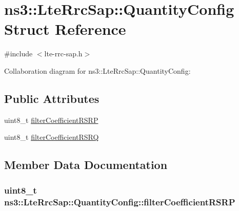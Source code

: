 \hypertarget{structns3_1_1LteRrcSap_1_1QuantityConfig}{}\section{ns3\+:\+:Lte\+Rrc\+Sap\+:\+:Quantity\+Config Struct Reference}
\label{structns3_1_1LteRrcSap_1_1QuantityConfig}


{\ttfamily \#include $<$lte-\/rrc-\/sap.\+h$>$}



Collaboration diagram for ns3\+:\+:Lte\+Rrc\+Sap\+:\+:Quantity\+Config\+:
\subsection*{Public Attributes}
\begin{DoxyCompactItemize}
\item 
uint8\+\_\+t \hyperlink{structns3_1_1LteRrcSap_1_1QuantityConfig_ac60962e2b022dfa1b9b3d28b7900a4f8}{filter\+Coefficient\+R\+S\+RP}
\item 
uint8\+\_\+t \hyperlink{structns3_1_1LteRrcSap_1_1QuantityConfig_a5b8c0642e518d9410c533069a442f3f0}{filter\+Coefficient\+R\+S\+RQ}
\end{DoxyCompactItemize}


\subsection{Member Data Documentation}
\subsubsection[{\texorpdfstring{filter\+Coefficient\+R\+S\+RP}{filterCoefficientRSRP}}]{\setlength{\rightskip}{0pt plus 5cm}uint8\+\_\+t ns3\+::\+Lte\+Rrc\+Sap\+::\+Quantity\+Config\+::filter\+Coefficient\+R\+S\+RP}\hypertarget{structns3_1_1LteRrcSap_1_1QuantityConfig_ac60962e2b022dfa1b9b3d28b7900a4f8}{}\label{structns3_1_1LteRrcSap_1_1QuantityConfig_ac60962e2b022dfa1b9b3d28b7900a4f8}
